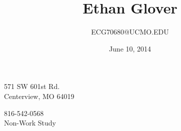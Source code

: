 \documentclass[10pt]{article}
\title{\bfseries\Huge Ethan Glover}
\author{ECG70680@UCMO.EDU}
\date{June 10, 2014}
\begin{document}
\maketitle
\vspace{1em}
\begin{minipage}[ht]{0.75\textwidth}
571 SW 601st Rd.\\
Centerview, MO 64019
\end{minipage}
\begin{minipage}[ht]{0.75\textwidth}
816-542-0568\\
Non-Work Study
\end{minipage}
\vspace{20pt}
 
\end{document}
